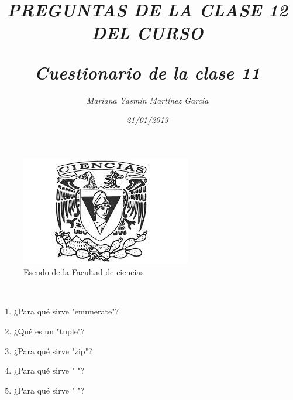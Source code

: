 \documentclass{article}
\title{\Huge\item\color{magenta}\textit{PREGUNTAS DE LA CLASE 12 DEL CURSO}}
\author{\Large\textit{Mariana Yasmin Martínez García}}
\date{\Large\textit{21/01/2019}}
\begin{document}
\begin{figure}[t]
	\centering
	\includegraphics[width=0.7\linewidth]{Imagenes/1}
	\caption{Escudo de la Facultad de ciencias}
	\label{figura:1}
\end{figure}

	\maketitle
		
	\newpage
	
	\title{\huge\color{magenta}\textbf{\textit{Cuestionario de la clase 11}}} \\
	\begin{enumerate}
		 \item{\Large\color{red} ¿Para qué sirve "enumerate"?}
		 \item{\Large\color{red} ¿Qué es un "tuple"?}
		 \item{\Large\color{red} ¿Para qué sirve "zip"?}
		 \item{\Large\color{red} ¿Para qué sirve " "?}
		 \item{\Large\color{red} ¿Para qué sirve " "?}
	\end{enumerate}
	
\end{document}
